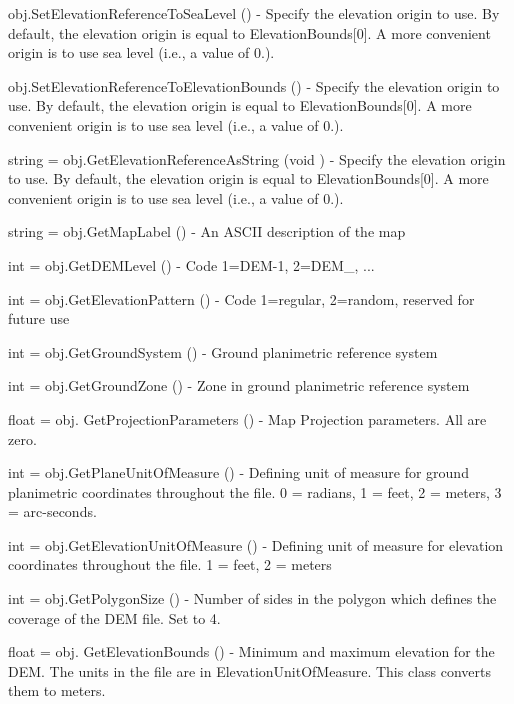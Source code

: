 \begin{DoxyItemize}
\item {\ttfamily obj.\-Set\-Elevation\-Reference\-To\-Sea\-Level ()} -\/ Specify the elevation origin to use. By default, the elevation origin is equal to Elevation\-Bounds\mbox{[}0\mbox{]}. A more convenient origin is to use sea level (i.\-e., a value of 0.).  
\item {\ttfamily obj.\-Set\-Elevation\-Reference\-To\-Elevation\-Bounds ()} -\/ Specify the elevation origin to use. By default, the elevation origin is equal to Elevation\-Bounds\mbox{[}0\mbox{]}. A more convenient origin is to use sea level (i.\-e., a value of 0.).  
\item {\ttfamily string = obj.\-Get\-Elevation\-Reference\-As\-String (void )} -\/ Specify the elevation origin to use. By default, the elevation origin is equal to Elevation\-Bounds\mbox{[}0\mbox{]}. A more convenient origin is to use sea level (i.\-e., a value of 0.).  
\item {\ttfamily string = obj.\-Get\-Map\-Label ()} -\/ An A\-S\-C\-I\-I description of the map  
\item {\ttfamily int = obj.\-Get\-D\-E\-M\-Level ()} -\/ Code 1=D\-E\-M-\/1, 2=D\-E\-M\-\_, ...  
\item {\ttfamily int = obj.\-Get\-Elevation\-Pattern ()} -\/ Code 1=regular, 2=random, reserved for future use  
\item {\ttfamily int = obj.\-Get\-Ground\-System ()} -\/ Ground planimetric reference system  
\item {\ttfamily int = obj.\-Get\-Ground\-Zone ()} -\/ Zone in ground planimetric reference system  
\item {\ttfamily float = obj. Get\-Projection\-Parameters ()} -\/ Map Projection parameters. All are zero.  
\item {\ttfamily int = obj.\-Get\-Plane\-Unit\-Of\-Measure ()} -\/ Defining unit of measure for ground planimetric coordinates throughout the file. 0 = radians, 1 = feet, 2 = meters, 3 = arc-\/seconds.  
\item {\ttfamily int = obj.\-Get\-Elevation\-Unit\-Of\-Measure ()} -\/ Defining unit of measure for elevation coordinates throughout the file. 1 = feet, 2 = meters  
\item {\ttfamily int = obj.\-Get\-Polygon\-Size ()} -\/ Number of sides in the polygon which defines the coverage of the D\-E\-M file. Set to 4.  
\item {\ttfamily float = obj. Get\-Elevation\-Bounds ()} -\/ Minimum and maximum elevation for the D\-E\-M. The units in the file are in Elevation\-Unit\-Of\-Measure. This class converts them to meters.  

\end{DoxyItemize}
